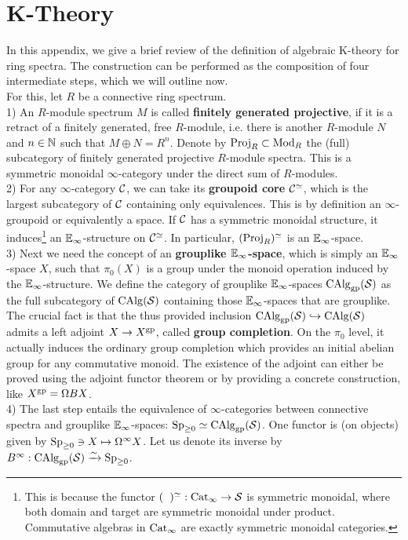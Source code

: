\appendix
\chapter{K-Theory}
In this appendix, we give a brief review of the definition of algebraic K-theory for ring spectra. The construction can be performed as the composition of four intermediate steps, which we will outline now. \\
For this, let $R$ be a connective ring spectrum. \\
1) An $R$-module spectrum $M$ is called \textbf{finitely generated projective}, if it is a retract of a finitely generated, free $R$-module, i.e. there is another $R$-module $N$ and  $n\in\mathbb{N}$ such that $M\oplus N=R^n$.
Denote by $\operatorname{Proj}_R\subset \operatorname{Mod}_R$ the (full) subcategory of finitely generated projective $R$-module spectra. This is a symmetric monoidal $\infty$-category under the direct sum of $R$-modules. \\
2) For any $\infty$-category $\mathcal{C}$, we can take its \textbf{groupoid core} $\mathcal{C}^{\simeq}$, which is the largest subcategory of $\mathcal{C}$ containing only equivalences. 
This is by definition an $\infty$-groupoid or equivalently a space. 
If $\mathcal{C}$ has a symmetric monoidal structure, it induces\footnote{This is because the functor $(\phantom{\cC})^{\simeq}:\Cat_{\infty}\ra \Spc$ is symmetric monoidal, where both domain and target are symmetric monoidal under product. 
Commutative algebras in $\operatorname{Cat}_\infty$ are exactly symmetric monoidal categories.} an $\mathbb{E}_\infty$-structure on $\mathcal{C}^{\simeq}$. 
In particular, $(\operatorname{Proj}_R)^{\simeq}$ is an $\mathbb{E}_\infty$-space.\\
3) Next we need the concept of an \textbf{grouplike $\mathbb{E}_\infty$-space}, which is simply an $\mathbb{E}_\infty$-space $X$, such that $\pi_0(X)$ is a group under the monoid operation induced by the $\mathbb{E}_\infty$-structure.
We define the category of grouplike $\mathbb{E}_\infty$-spaces $\operatorname{CAlg}_{\operatorname{gp}}(\mathcal{S})$ as the full subcategory of $\operatorname{CAlg}(\mathcal{S})$ containing those  $\mathbb{E}_\infty$-spaces that are grouplike.
The crucial fact is that the thus provided inclusion $\operatorname{CAlg}_{\operatorname{gp}}(\mathcal{S})\hookrightarrow \operatorname{CAlg}(\mathcal{S})$ admits a left adjoint $X\to X^{\operatorname{gp}}$, called \textbf{group completion}. On the $\pi_0$ level, it actually induces the ordinary group completion which provides an initial abelian group for any commutative monoid. The existence of the adjoint can either be proved using the adjoint functor theorem or by providing a concrete construction, like $X^{\operatorname{gp}}=\Omega BX$. \\
4) The last step entails the equivalence of $\infty$-categories between connective spectra and grouplike $\mathbb{E}_\infty$-spaces: $\operatorname{Sp}_{\geq 0}\simeq \operatorname{CAlg}_{\operatorname{gp}}(\mathcal{S})$. One functor is (on objects) given by $\operatorname{Sp}_{\geq 0}\ni X\mapsto \Omega^{\infty}X$. Let us denote its inverse by $B^\infty:\operatorname{CAlg}_{\operatorname{gp}}(\mathcal{S})\xrightarrow{\sim} \operatorname{Sp}_{\geq 0} $.  \\
